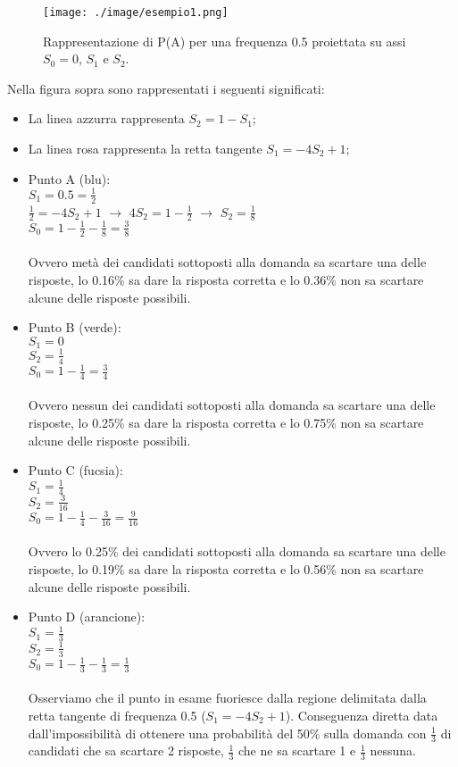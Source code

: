 \begin{figure}[H]
\centering
	\texttt{[image: ./image/esempio1.png]}
	\caption{Rappresentazione di P(A) per una frequenza 0.5 proiettata su assi $S_0=0$, $S_1$ e $S_2$.}
\end{figure}

\noindent
Nella figura sopra sono rappresentati i seguenti significati:
\begin{itemize}
\item La linea azzurra rappresenta $S_2=1-S_1$;
\item La linea rosa rappresenta la retta tangente $S_1=-4S_2+1$;
\item Punto A (blu): \\
$S_1=0.5=\frac{1}{2}$ \\
$\frac{1}{2}=-4S_2+1$ $\rightarrow$ $4S_2=1-\frac{1}{2}$ $\rightarrow$ $S_2=\frac{1}{8}$ \\
$S_0=1-\frac{1}{2}-\frac{1}{8}=\frac{3}{8}$\\
\\
Ovvero met\`a dei candidati sottoposti alla domanda sa scartare una delle risposte, lo 0.16\% sa dare la risposta corretta e lo 0.36\% non sa scartare alcune delle risposte possibili.
\item Punto B (verde): \\
$S_1=0$\\
$S_2=\frac{1}{4}$\\
$S_0=1-\frac{1}{4}=\frac{3}{4}$\\
\\
Ovvero nessun dei candidati sottoposti alla domanda sa scartare una delle risposte, lo 0.25\% sa dare la risposta corretta e lo 0.75\% non sa scartare alcune delle risposte possibili.
\item Punto C (fucsia): \\
$S_1=\frac{1}{4}$\\
$S_2=\frac{3}{16}$\\
$S_0=1-\frac{1}{4}-\frac{3}{16}=\frac{9}{16}$\\
\\
Ovvero lo 0.25\% dei candidati sottoposti alla domanda sa scartare una delle risposte, lo 0.19\% sa dare la risposta corretta e lo 0.56\% non sa scartare alcune delle risposte possibili.
\item Punto D (arancione): \\
$S_1=\frac{1}{3}$\\
$S_2=\frac{1}{3}$\\
$S_0=1-\frac{1}{3}-\frac{1}{3}=\frac{1}{3}$\\
\\
Osserviamo che il punto in esame fuoriesce dalla regione delimitata dalla retta tangente di frequenza 0.5 ($S_1=-4S_2+1$). Conseguenza diretta data dall'impossibilit\`a di ottenere una probabilit\`a del 50\% sulla domanda con $\frac{1}{3}$ di candidati che sa scartare 2 risposte, $\frac{1}{3}$ che ne sa scartare 1 e $\frac{1}{3}$ nessuna.
\end{itemize}
